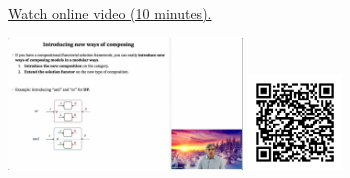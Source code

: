 
\begin{minipage}{10cm}
    \href{https://act4e-spring21.netlify.app/videos/spring2021-functorial-comp-a:solving-queries:or-and-and.html}{Watch online video (10 minutes).}
        
    \href{https://act4e-spring21.netlify.app/videos/spring2021-functorial-comp-a:solving-queries:or-and-and.html}{\includegraphics[height=3.5cm]{spring2021-functorial-comp-a:solving-queries:or-and-and/thumbnails.jpg}}
    \href{https://act4e-spring21.netlify.app/videos/spring2021-functorial-comp-a:solving-queries:or-and-and.html}{\includegraphics[height=2.5cm]{spring2021-functorial-comp-a:solving-queries:or-and-and/qrcode.png}}
\end{minipage}
